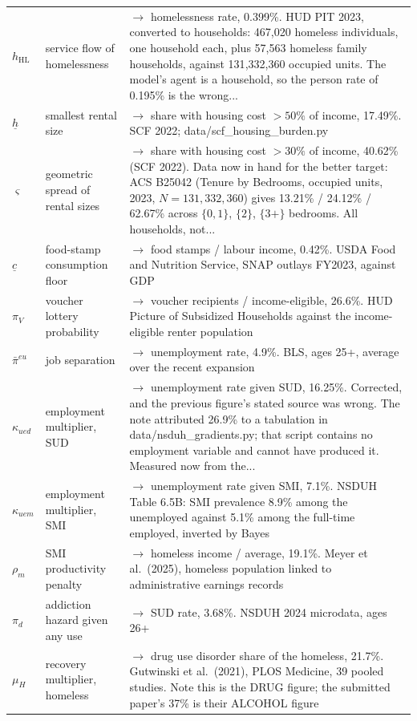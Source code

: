 \begin{longtable}{@{}lL{3.6cm}L{7.4cm}@{}}
$h_{\text{HL}}$ & service flow of homelessness & $\rightarrow$ homelessness rate, {0.399\%}. {HUD PIT 2023, converted to {households}: 467{,}020 homeless individuals, one household each, plus 57{,}563 homeless family households, against 131{,}332{,}360 occupied units. The model's agent is a household, so the person rate of 0.195\% is the wrong... } \\
$\underline h$ & smallest rental size & $\rightarrow$ share with housing cost $>50\%$ of income, 17.49\%. SCF 2022; {data/scf\_housing\_burden.py}  \\
$\varsigma$ & geometric spread of rental sizes & $\rightarrow$ share with housing cost $>30\%$ of income, 40.62\% (SCF 2022). {{Data now in hand} for the better target: ACS B25042 ({Tenure by Bedrooms}, occupied units, 2023, $N=131{,}332{,}360$) gives 13.21\% / 24.12\% / 62.67\% across $\{0,1\}$, $\{2\}$, $\{3+\}$ bedrooms. All households, not... } \\
$\underline c$ & food-stamp consumption floor & $\rightarrow$ food stamps / labour income, 0.42\%. USDA Food and Nutrition Service, SNAP outlays FY2023, against GDP  \\
$\pi_V$ & voucher lottery probability & $\rightarrow$ voucher recipients / income-eligible, 26.6\%. HUD Picture of Subsidized Households against the income-eligible renter population  \\
$\bar\pi^{eu}$ & job separation & $\rightarrow$ unemployment rate, 4.9\%. BLS, ages 25+, average over the recent expansion  \\
$\kappa_{ued}$ & employment multiplier, SUD & $\rightarrow$ unemployment rate given SUD, {{16.25\%}}. {{Corrected, and the previous figure's stated source was wrong.} The note attributed 26.9\% to a tabulation in {data/nsduh\_gradients.py}; that script contains no employment variable and cannot have produced it. Measured now from the... } \\
$\kappa_{uem}$ & employment multiplier, SMI & $\rightarrow$ unemployment rate given SMI, 7.1\%. NSDUH Table 6.5B: SMI prevalence 8.9\% among the unemployed against 5.1\% among the full-time employed, inverted by Bayes  \\
$\rho_m$ & SMI productivity penalty & $\rightarrow$ homeless income / average, 19.1\%. Meyer et al.\ (2025), homeless population linked to administrative earnings records  \\
$\pi_d$ & addiction hazard given any use & $\rightarrow$ SUD rate, 3.68\%. NSDUH 2024 microdata, ages 26+  \\
$\mu_H$ & recovery multiplier, homeless & $\rightarrow$ drug use disorder share of the homeless, 21.7\%. Gutwinski et al.\ (2021), {PLOS Medicine}, 39 pooled studies. Note this is the DRUG figure; the submitted paper's 37\% is their ALCOHOL figure  \\

\end{longtable}
